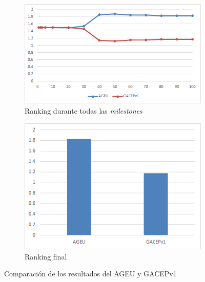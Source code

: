 \begin{figure}
     \centering
     \begin{subfigure}[b]{0.45\textwidth}
         \centering
         \includegraphics[width=\textwidth]{imagenes/Experimental/AGEUvsGACEPv1.png}
         \caption{Ranking durante todas las \textit{milestones}}
         \label{fig:AGEUvsGACEPv1_lineas}
     \end{subfigure}
     \hfill
     \begin{subfigure}[b]{0.45\textwidth}
         \centering
         \includegraphics[width=\textwidth]{imagenes/Experimental/barras/AGEUvsGACEPv1.png}
         \caption{Ranking final}
         \label{fig:AGEUvsGACEPv1_barras}
     \end{subfigure}
        \caption{Comparación de los resultados del AGEU y GACEPv1}
        \label{fig:AGEUvsGACEPv1}
\end{figure}

